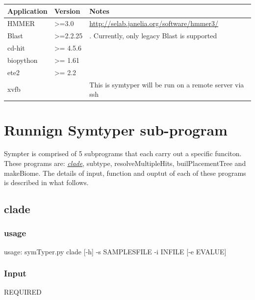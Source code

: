 \documentclass[letterpaper,10pt,english]{sphinxmanual}
\begin{document}
\begin{tabulary}{\linewidth}{|L|L|L|}
\hline
\textsf{\relax 
Application
} & \textsf{\relax 
Version
} & \textsf{\relax 
Notes
}\\
\hline
HMMER
 & 
\textgreater{}=3.0
 & 
\href{http://selab.janelia.org/software/hmmer3/}{http://selab.janelia.org/software/hmmer3/}
\\

Blast
 & 
\textgreater{}=2.2.25
 & 
. Currently, only legacy Blast is supported
\\

cd-hit
 & 
\textgreater{}= 4.5.6
 & \\

biopython
 & 
\textgreater{}= 1.61
 & \\

ete2
 & 
\textgreater{}= 2.2
 & \\

xvfb
 &  & 
This is symtyper will be run on a remote server via ssh
\\
\hline\end{tabulary}



\section{Runnign Symtyper sub-program}
\label{CommanLine:runnign-symtyper-sub-program}
Sympter is comprised of 5 subprograms that each carry out a specific funciton.
These programs are: {\hyperref[CommanLine:clade]{\emph{clade}}}, subtype, resolveMultipleHits, builPlacementTree and makeBiome.
The details of input, function and ouptut of each of these programs is described in what follows.


\subsection{clade}
\label{CommanLine:clade}\label{CommanLine:id1}

\subsubsection{usage}
\label{CommanLine:usage}
usage: symTyper.py clade {[}-h{]} -s SAMPLESFILE -i INFILE {[}-e EVALUE{]}


\subsubsection{Input}
\label{CommanLine:input}
REQUIRED
\end{document}
